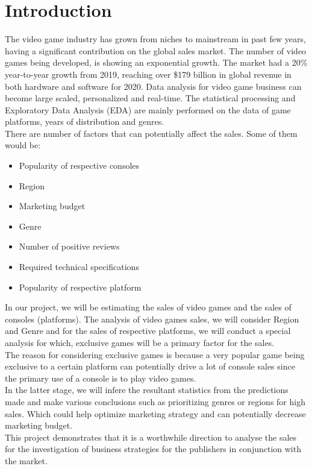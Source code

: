 \documentclass[conference]{IEEEtran}
\begin{document}
\section{Introduction}
The video game industry has grown from niches to mainstream in past few years, having a significant contribution on the global sales market. The number of video games being developed, is showing an exponential growth. The market had a 20\% year-to-year growth from 2019, reaching over \$179 billion in global revenue in both hardware and software for 2020\cite{b1}.  Data analysis for video game business can become large scaled, personalized and real-time. The
statistical processing and Exploratory Data Analysis (EDA) are mainly performed on the data of game platforms, years of distribution and genres.\\
There are number of factors that can potentially affect the sales. Some of them would be:
\begin{itemize}
    \item Popularity of respective consoles
    \item Region
    \item Marketing budget
    \item Genre
    \item Number of positive reviews
    \item Required technical specifications
    \item Popularity of respective platform
\end{itemize}
In our project, we will be estimating the sales of video games and the sales of consoles (platforms). The analysis of video games sales, we will consider Region and Genre and for the sales of respective platforms, we will conduct a special analysis for which, exclusive games will be a primary factor for the sales.\\ The reason for considering exclusive games is because a very popular game being exclusive to a certain platform can potentially drive a lot of console sales since the primary use of a console is to play video games.\\
In the latter stage, we will infere the resultant statistics from the predictions made and make various conclusions such as prioritizing genres or regions for high sales. Which could help optimize marketing strategy and can potentially decrease marketing budget.\\
This project demonstrates that it is a worthwhile direction to analyse the sales for the investigation of business strategies for the publishers in conjunction with the market.
\end{document}
